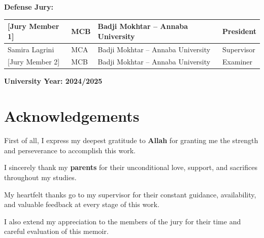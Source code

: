 \documentclass[12pt,a4paper]{report}
\begin{document}
\begin{titlepage}
  \vspace{0.45cm}

  \begin{center}
    \textbf{Defense Jury:}\\[8pt]
    \begin{tabular}{|p{3.8cm}|p{1.5cm}|p{4.2cm}|p{2.5cm}|}
      \hline
      {[Jury Member 1]} & MCB & Badji Mokhtar -- Annaba University & President   \\ \hline
      {Samira Lagrini}  & MCA & Badji Mokhtar -- Annaba University & Supervisor  \\ \hline
      {[Jury Member 2]} & MCB & Badji Mokhtar -- Annaba University & Examiner    \\ \hline
    \end{tabular}
  \end{center}

  \vfill

  \begin{center}
    {\normalsize\bfseries University Year: 2024/2025}
  \end{center}

\end{titlepage}


\newpage
\chapter*{Acknowledgements}

\vspace{1cm}

First of all, I express my deepest gratitude to \textbf{Allah} for granting me
the strength and perseverance to accomplish this work.

\vspace{0.5cm}
I sincerely thank my \textbf{parents} for their unconditional love, support,
and sacrifices throughout my studies.

\vspace{0.5cm}
My heartfelt thanks go to my supervisor for their constant guidance,
availability, and valuable feedback at every stage of this work.

\vspace{0.5cm}
I also extend my appreciation to the members of the jury for their time
and careful evaluation of this memoir.
\end{document}
